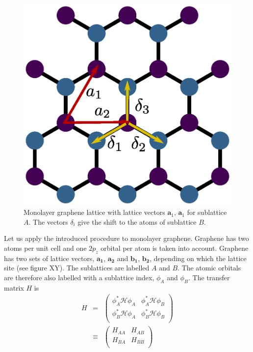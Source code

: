 \begin{figure}
\centering
\includegraphics[width=\textwidth]{figure/numericalframework/graphene-lattice-small}
\caption{Monolayer graphene lattice with lattice vectors $\mathbf{a}_1$, $\mathbf{a}_1$ for sublattice $A$. The vectors $\delta_i$ give the shift to the atoms of sublattice $B$. }
\end{figure}
Let us apply the introduced procedure to monolayer graphene. Graphene has two atoms per unit cell and  one $2p_z$ orbital per atom is taken into account. Graphene has two sets of lattice vectors, $\mathbf{a_1}$, $\mathbf{a_2}$ and $\mathbf{b_1}$, $\mathbf{b_2}$, depending on which the lattice site (see figure XY). The sublattices are labelled $A$ and $B$. The atomic orbitals are therefore also labelled with a sublattice index, $\phi_A$ and $\phi_B$. The transfer matrix $H$ is
\begin{eqnarray}
H &=& \begin{pmatrix}
\phi_A^* \mathcal{H} \phi_A & \phi_A^* \mathcal{H} \phi_B \\
\phi_B^* \mathcal{H} \phi_A & \phi_B^* \mathcal{H} \phi_B\\
\end{pmatrix} \\
&\equiv& \begin{pmatrix}
H_{A A} & H_{A B} \\
H_{B A} & H_{B B}\\
\end{pmatrix}
\end{eqnarray}

